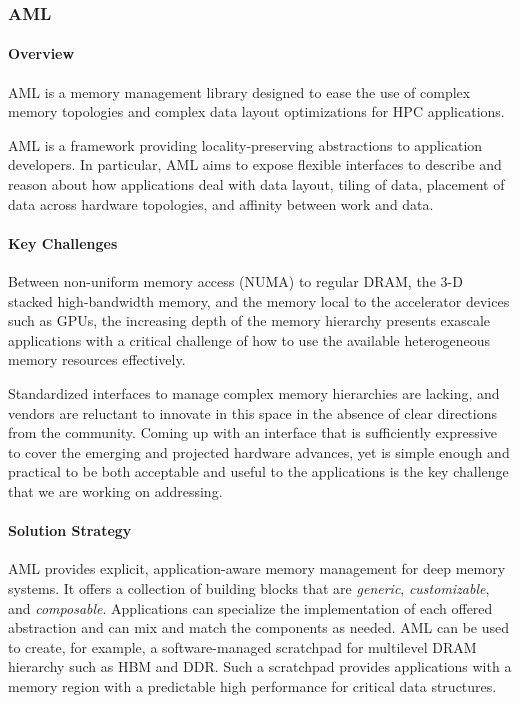 \subsubsection*{AML}

\paragraph{Overview}

AML is a memory management library designed to ease the use of complex
memory topologies and complex data layout optimizations for
HPC applications.

AML is a framework providing locality-preserving abstractions to
application developers.  In particular, AML aims to expose flexible
interfaces to describe and reason about how applications deal with data
layout, tiling of data, placement of data across hardware topologies, and
affinity between work and data.

\paragraph{Key Challenges}

Between non-uniform memory access (NUMA) to regular DRAM, the 3-D stacked
high-bandwidth memory, and the memory local to the accelerator devices such
as GPUs, the increasing depth of the memory hierarchy presents exascale
applications with a critical challenge of how to use the available
heterogeneous memory resources effectively.

Standardized interfaces to manage complex memory hierarchies are lacking,
and vendors are reluctant to innovate in this space in the absence of clear
directions from the community.  Coming up with an interface that is
sufficiently expressive to cover the emerging and projected hardware
advances, yet is simple enough and practical to be both acceptable and
useful to the applications is the key challenge that we are working on
addressing.

\paragraph{Solution Strategy}

AML provides explicit, application-aware memory management for deep memory
systems.  It offers a collection of building blocks that
are \emph{generic}, \emph{customizable}, and \emph{composable}.
Applications can specialize the implementation of each offered abstraction
and can mix and match the components as needed.  AML can be used to create,
for example, a software-managed scratchpad for multilevel DRAM hierarchy
such as HBM and DDR.  Such a scratchpad provides applications with a memory
region with a predictable high performance for critical data structures.

